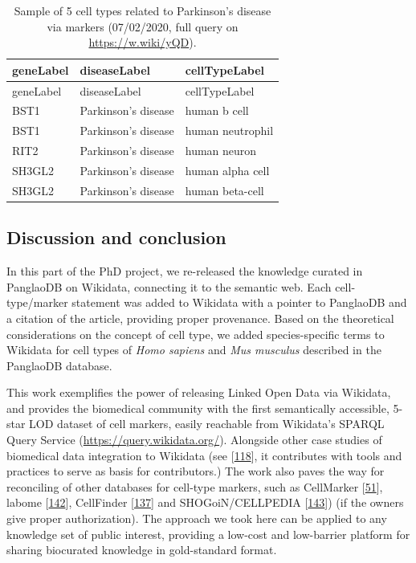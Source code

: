 \begin{longtable}[]{@{}lll@{}}
\caption{Sample of 5 cell types related to Parkinson's disease via markers (07/02/2020, full query on \url{https://w.wiki/yQD}).
\label{tbl:parkinson}}\tabularnewline
\toprule
geneLabel & diseaseLabel & cellTypeLabel \\
\midrule
\endfirsthead
\toprule
geneLabel & diseaseLabel & cellTypeLabel \\
\midrule
\endhead
BST1 & Parkinson's disease & human b cell \\
BST1 & Parkinson's disease & human neutrophil \\
RIT2 & Parkinson's disease & human neuron \\
SH3GL2 & Parkinson's disease & human alpha cell \\
SH3GL2 & Parkinson's disease & human beta-cell \\
\bottomrule
\end{longtable}

\hypertarget{discussion-and-conclusion}{%
\subsection{Discussion and conclusion}\label{discussion-and-conclusion}}

In this part of the PhD project, we re-released the knowledge curated in PanglaoDB on Wikidata, connecting it to the semantic web.
Each cell-type/marker statement was added to Wikidata with a pointer to PanglaoDB and a citation of the article, providing proper provenance.
Based on the theoretical considerations on the concept of cell type, we added species-specific terms to Wikidata for cell types of \emph{Homo sapiens} and \emph{Mus musculus} described in the PanglaoDB database.

This work exemplifies the power of releasing Linked Open Data via Wikidata, and provides the biomedical community with the first semantically accessible, 5-star LOD dataset of cell markers, easily reachable from Wikidata's SPARQL Query Service (\url{https://query.wikidata.org/}).
Alongside other case studies of biomedical data integration to Wikidata (see {[}\protect\hyperlink{ref-mPoPwN77}{118}{]}, it contributes with tools and practices to serve as basis for contributors.)
The work also paves the way for reconciling of other databases for cell-type markers, such as CellMarker {[}\protect\hyperlink{ref-chGii6yw}{51}{]}, labome {[}\protect\hyperlink{ref-rhRRCtlA}{142}{]}, CellFinder {[}\protect\hyperlink{ref-4AEy2xhQ}{137}{]} and SHOGoiN/CELLPEDIA {[}\protect\hyperlink{ref-6uWWsiSq}{143}{]}) (if the owners give proper authorization).
The approach we took here can be applied to any knowledge set of public interest, providing a low-cost and low-barrier platform for sharing biocurated knowledge in gold-standard format.

